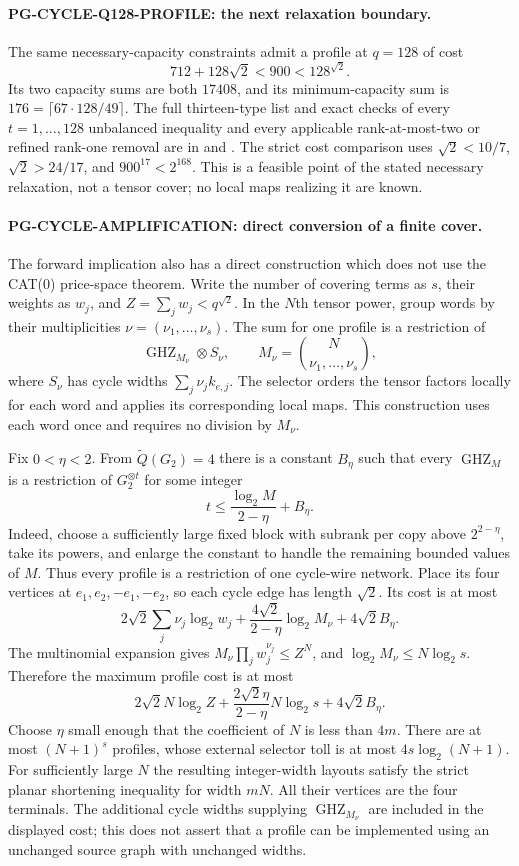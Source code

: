 \paragraph{PG-CYCLE-Q128-PROFILE: the next relaxation boundary.}
The same necessary-capacity constraints admit a profile at
$q=128$ of cost
\[
 712+128\sqrt2<900<128^{\sqrt2}.
\]
Its two capacity sums are both $17408$, and its minimum-capacity
sum is $176=\lceil67\cdot128/49\rceil$.
The full thirteen-type list and exact checks of every
$t=1,\ldots,128$ unbalanced inequality and every applicable
rank-at-most-two or refined rank-one removal are in
 and
.
The strict cost comparison uses $\sqrt2<10/7$,
$\sqrt2>24/17$, and $900^{17}<2^{168}$.
This is a feasible point of the stated necessary relaxation,
not a tensor cover; no local maps realizing it are known.

\paragraph{PG-CYCLE-AMPLIFICATION: direct conversion of a finite cover.}
The forward implication also has a direct construction which does
not use the CAT(0) price-space theorem. Write the number of covering
terms as $s$, their weights as $w_j$, and $Z=\sum_jw_j<q^{\sqrt2}$.
In the $N$th tensor power, group words by their multiplicities
$\nu=(\nu_1,\ldots,\nu_s)$. The sum for one profile is a
restriction of
\[
 \operatorname{GHZ}_{M_\nu}\otimes S_\nu,
 \qquad M_\nu=\binom{N}{\nu_1,\ldots,\nu_s},
\]
where $S_\nu$ has cycle widths $\sum_j\nu_j k_{e,j}$.
The selector orders the tensor factors locally for each word and
applies its corresponding local maps. This construction uses each
word once and requires no division by $M_\nu$.

Fix $0<\eta<2$. From $\widetilde Q(G_2)=4$ there is a constant
$B_\eta$ such that every $\operatorname{GHZ}_M$ is a restriction
of $G_2^{\otimes t}$ for some integer
\[
 t\leq\frac{\log_2M}{2-\eta}+B_\eta.
\]
Indeed, choose a sufficiently large fixed block with subrank per
copy above $2^{2-\eta}$, take its powers, and enlarge the constant
to handle the remaining bounded values of $M$.
Thus every profile is a restriction of one cycle-wire network.
Place its four vertices at $e_1,e_2,-e_1,-e_2$, so each cycle edge
has length $\sqrt2$. Its cost is at most
\[
 2\sqrt2\sum_j\nu_j\log_2w_j
 +\frac{4\sqrt2}{2-\eta}\log_2M_\nu+4\sqrt2 B_\eta.
\]
The multinomial expansion gives
$M_\nu\prod_jw_j^{\nu_j}\leq Z^N$, and
$\log_2M_\nu\leq N\log_2s$. Therefore the maximum profile
cost is at most
\[
 2\sqrt2 N\log_2Z
 +\frac{2\sqrt2\eta}{2-\eta}N\log_2s
 +4\sqrt2 B_\eta.
\]
Choose $\eta$ small enough that the coefficient of $N$ is less
than $4m$. There are at most $(N+1)^s$ profiles, whose external
selector toll is at most $4s\log_2(N+1)$. For sufficiently large
$N$ the resulting integer-width layouts satisfy the strict
planar shortening inequality for width $mN$. All their vertices
are the four terminals. The additional cycle widths supplying
$\operatorname{GHZ}_{M_\nu}$ are included in the displayed cost;
this does not assert that a profile can be implemented using an
unchanged source graph with unchanged widths.


